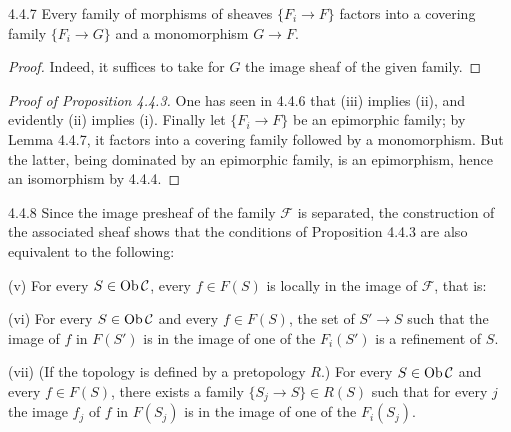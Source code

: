 \begin{lemma}{4.4.7}\label{IV.4.4.7}
Every family of morphisms of sheaves \(\{F_i\to F\}\) factors
into a covering family \(\{F_i\to G\}\) and a monomorphism \(G\to F\).
\end{lemma}
\begin{proof}
Indeed, it suffices to take for \(G\) the image sheaf of the given family.
\end{proof}

\begin{proof}[Proof of Proposition 4.4.3]
One has seen in 4.4.6 that (iii) implies (ii), and evidently
(ii) implies (i). Finally let \(\{F_i\to F\}\) be an epimorphic
family; by Lemma 4.4.7, it factors into a covering family followed
by a monomorphism. But the latter, being dominated
by an epimorphic family, is an epimorphism, hence an isomorphism by 4.4.4.
\end{proof}

\begin{remark}{4.4.8}\label{IV.4.4.8}
Since the image presheaf of the family \(\mathcal F\) is separated,
the construction of the associated sheaf shows that the conditions
of Proposition 4.4.3 are also equivalent to the following:

(v) For every \(S\in\operatorname{Ob}\mathcal C\), every \(f\in F(S)\) is
locally in the image of \(\mathcal F\), that is:

(vi) For every \(S\in\operatorname{Ob}\mathcal C\) and every \(f\in F(S)\),
the set of \(S'\to S\) such that the image of \(f\) in \(F(S')\)
is in the image of one of the \(F_i(S')\) is a refinement of \(S\).

(vii) (If the topology is defined by a pretopology \(R\).)
For every \(S\in\operatorname{Ob}\mathcal C\) and every \(f\in F(S)\), there
exists a family \(\{S_j\to S\}\in R(S)\) such that for every \(j\)
the image \(f_j\) of \(f\) in \(F(S_j)\) is in the image of one
of the \(F_i(S_j)\).
\end{remark}

